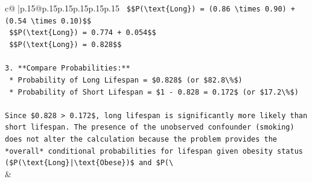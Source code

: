 \documentclass{article}
\begin{document}
{\begin{supertabular}{c@{$\;$}|p{.15\linewidth}@{}p{.15\linewidth}p{.15\linewidth}p{.15\linewidth}p{.15\linewidth}p{.15\linewidth}}
{{{\texttt{    \$\$P(\textbackslash{}text\{Long\}) = (0.86 \textbackslash{}times 0.90) + (0.54 \textbackslash{}times 0.10)\$\$} \\
\texttt{    \$\$P(\textbackslash{}text\{Long\}) = 0.774 + 0.054\$\$} \\
\texttt{    \$\$P(\textbackslash{}text\{Long\}) = 0.828\$\$} \\
\\ 
\texttt{3.  **Compare Probabilities:**} \\
\texttt{    *   Probability of Long Lifespan = \$0.828\$ (or \$82.8\textbackslash{}\%\$)} \\
\texttt{    *   Probability of Short Lifespan = \$1 {-} 0.828 = 0.172\$ (or \$17.2\textbackslash{}\%\$)} \\
\\ 
\texttt{Since \$0.828 > 0.172\$, long lifespan is significantly more likely than short lifespan. The presence of the unobserved confounder (smoking) does not alter the calculation because the problem provides the *overall* conditional probabilities for lifespan given obesity status (\$P(\textbackslash{}text\{Long\}|\textbackslash{}text\{Obese\})\$ and \$P(\textbackslash{}} \\
            }
        }
    }
    & \\ \\


\end{supertabular}}
\end{document}
